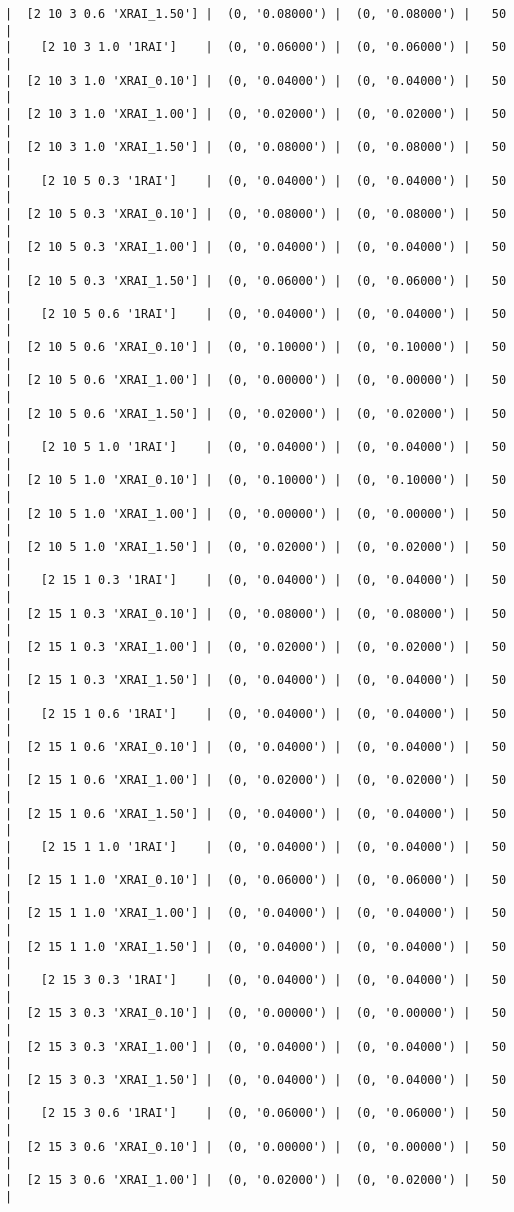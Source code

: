 \documentclass{article}
\begin{document}
\begin{verbatim}
|  [2 10 3 0.6 'XRAI_1.50'] |  (0, '0.08000') |  (0, '0.08000') |   50  |
|    [2 10 3 1.0 '1RAI']    |  (0, '0.06000') |  (0, '0.06000') |   50  |
|  [2 10 3 1.0 'XRAI_0.10'] |  (0, '0.04000') |  (0, '0.04000') |   50  |
|  [2 10 3 1.0 'XRAI_1.00'] |  (0, '0.02000') |  (0, '0.02000') |   50  |
|  [2 10 3 1.0 'XRAI_1.50'] |  (0, '0.08000') |  (0, '0.08000') |   50  |
|    [2 10 5 0.3 '1RAI']    |  (0, '0.04000') |  (0, '0.04000') |   50  |
|  [2 10 5 0.3 'XRAI_0.10'] |  (0, '0.08000') |  (0, '0.08000') |   50  |
|  [2 10 5 0.3 'XRAI_1.00'] |  (0, '0.04000') |  (0, '0.04000') |   50  |
|  [2 10 5 0.3 'XRAI_1.50'] |  (0, '0.06000') |  (0, '0.06000') |   50  |
|    [2 10 5 0.6 '1RAI']    |  (0, '0.04000') |  (0, '0.04000') |   50  |
|  [2 10 5 0.6 'XRAI_0.10'] |  (0, '0.10000') |  (0, '0.10000') |   50  |
|  [2 10 5 0.6 'XRAI_1.00'] |  (0, '0.00000') |  (0, '0.00000') |   50  |
|  [2 10 5 0.6 'XRAI_1.50'] |  (0, '0.02000') |  (0, '0.02000') |   50  |
|    [2 10 5 1.0 '1RAI']    |  (0, '0.04000') |  (0, '0.04000') |   50  |
|  [2 10 5 1.0 'XRAI_0.10'] |  (0, '0.10000') |  (0, '0.10000') |   50  |
|  [2 10 5 1.0 'XRAI_1.00'] |  (0, '0.00000') |  (0, '0.00000') |   50  |
|  [2 10 5 1.0 'XRAI_1.50'] |  (0, '0.02000') |  (0, '0.02000') |   50  |
|    [2 15 1 0.3 '1RAI']    |  (0, '0.04000') |  (0, '0.04000') |   50  |
|  [2 15 1 0.3 'XRAI_0.10'] |  (0, '0.08000') |  (0, '0.08000') |   50  |
|  [2 15 1 0.3 'XRAI_1.00'] |  (0, '0.02000') |  (0, '0.02000') |   50  |
|  [2 15 1 0.3 'XRAI_1.50'] |  (0, '0.04000') |  (0, '0.04000') |   50  |
|    [2 15 1 0.6 '1RAI']    |  (0, '0.04000') |  (0, '0.04000') |   50  |
|  [2 15 1 0.6 'XRAI_0.10'] |  (0, '0.04000') |  (0, '0.04000') |   50  |
|  [2 15 1 0.6 'XRAI_1.00'] |  (0, '0.02000') |  (0, '0.02000') |   50  |
|  [2 15 1 0.6 'XRAI_1.50'] |  (0, '0.04000') |  (0, '0.04000') |   50  |
|    [2 15 1 1.0 '1RAI']    |  (0, '0.04000') |  (0, '0.04000') |   50  |
|  [2 15 1 1.0 'XRAI_0.10'] |  (0, '0.06000') |  (0, '0.06000') |   50  |
|  [2 15 1 1.0 'XRAI_1.00'] |  (0, '0.04000') |  (0, '0.04000') |   50  |
|  [2 15 1 1.0 'XRAI_1.50'] |  (0, '0.04000') |  (0, '0.04000') |   50  |
|    [2 15 3 0.3 '1RAI']    |  (0, '0.04000') |  (0, '0.04000') |   50  |
|  [2 15 3 0.3 'XRAI_0.10'] |  (0, '0.00000') |  (0, '0.00000') |   50  |
|  [2 15 3 0.3 'XRAI_1.00'] |  (0, '0.04000') |  (0, '0.04000') |   50  |
|  [2 15 3 0.3 'XRAI_1.50'] |  (0, '0.04000') |  (0, '0.04000') |   50  |
|    [2 15 3 0.6 '1RAI']    |  (0, '0.06000') |  (0, '0.06000') |   50  |
|  [2 15 3 0.6 'XRAI_0.10'] |  (0, '0.00000') |  (0, '0.00000') |   50  |
|  [2 15 3 0.6 'XRAI_1.00'] |  (0, '0.02000') |  (0, '0.02000') |   50  |

\end{verbatim}
\end{document}
